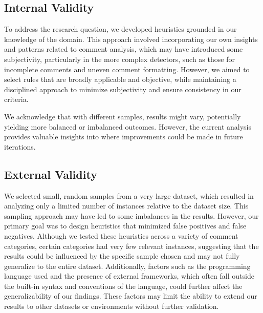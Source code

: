 \subsection{Internal Validity}
To address the research question, we developed heuristics grounded in our knowledge of the domain. This approach involved incorporating our own insights and patterns related to comment analysis, which may have introduced some subjectivity, particularly in the more complex detectors, such as those for incomplete comments and uneven comment formatting. However, we aimed to select rules that are broadly applicable and objective, while maintaining a disciplined approach to minimize subjectivity and ensure consistency in our criteria.

\noindent We acknowledge that with different samples, results might vary, potentially yielding more balanced or imbalanced outcomes. However, the current analysis provides valuable insights into where improvements could be made in future iterations.

\subsection{External Validity}
We selected small, random samples from a very large dataset, which resulted in analyzing only a limited number of instances relative to the dataset size. This sampling approach may have led to some imbalances in the results. However, our primary goal was to design heuristics that minimized false positives and false negatives. Although we tested these heuristics across a variety of comment categories, certain categories had very few relevant instances, suggesting that the results could be influenced by the specific sample chosen and may not fully generalize to the entire dataset.
Additionally, factors such as the programming language used and the presence of external frameworks, which often fall outside the built-in syntax and conventions of the language, could further affect the generalizability of our findings. These factors may limit the ability to extend our results to other datasets or environments without further validation.
